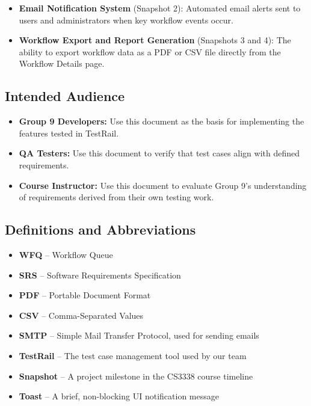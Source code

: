 \documentclass[12pt]{article}
\begin{document}
\begin{itemize}
    \item \textbf{Email Notification System} (Snapshot 2): Automated email alerts sent to
    users and administrators when key workflow events occur.
    \item \textbf{Workflow Export and Report Generation} (Snapshots 3 and 4): The ability
    to export workflow data as a PDF or CSV file directly from the Workflow Details page.
\end{itemize}
 
\subsection{Intended Audience}
\begin{itemize}
    \item \textbf{Group 9 Developers:} Use this document as the basis for implementing
    the features tested in TestRail.
    \item \textbf{QA Testers:} Use this document to verify that test cases align with
    defined requirements.
    \item \textbf{Course Instructor:} Use this document to evaluate Group 9's understanding
    of requirements derived from their own testing work.
\end{itemize}
 
\subsection{Definitions and Abbreviations}
\begin{itemize}
    \item \textbf{WFQ} -- Workflow Queue
    \item \textbf{SRS} -- Software Requirements Specification
    \item \textbf{PDF} -- Portable Document Format
    \item \textbf{CSV} -- Comma-Separated Values
    \item \textbf{SMTP} -- Simple Mail Transfer Protocol, used for sending emails
    \item \textbf{TestRail} -- The test case management tool used by our team
    \item \textbf{Snapshot} -- A project milestone in the CS3338 course timeline
    \item \textbf{Toast} -- A brief, non-blocking UI notification message
\end{itemize}
 
\end{document}
